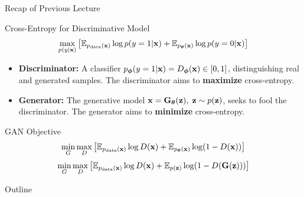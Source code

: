 \documentclass{beamer}
\begin{document}
\begin{frame}{Recap of Previous Lecture}
	\begin{block}{Cross-Entropy for Discriminative Model}
		\vspace{-0.3cm}
		\[
			\max_{p(y | \mathbf{x})} \left[\mathbb{E}_{p_{\text{data}}(\mathbf{x})} \log p(y = 1 | \mathbf{x}) + \mathbb{E}_{p_{\boldsymbol{\theta}}(\mathbf{x})} \log p(y = 0 | \mathbf{x}) \right] 
		\]
	\end{block}
	\eqpause
	\begin{itemize}
		\item \textbf{Discriminator:} A classifier $p_{\boldsymbol{\phi}}(y = 1 | \mathbf{x}) = D_{\boldsymbol{\phi}}(\mathbf{x}) \in [0, 1]$, distinguishing real and generated samples. The discriminator aims to \textbf{maximize} cross-entropy.
		\item \textbf{Generator:} The generative model $\mathbf{x} = \mathbf{G}_{\boldsymbol{\theta}}(\mathbf{z}),\; \mathbf{z} \sim p(\mathbf{z})$, seeks to fool the discriminator. The generator aims to \textbf{minimize} cross-entropy.
	\end{itemize}
	\eqpause
	\begin{block}{GAN Objective}
		\vspace{-0.5cm}
		\[
			\min_{G} \max_D \left[ \mathbb{E}_{p_{\text{data}}(\mathbf{x})} \log D(\mathbf{x}) + \mathbb{E}_{p_{\boldsymbol{\theta}}(\mathbf{x})} \log (1 - D(\mathbf{x})) \right] 
		\]
		\eqpause
		\[
			\min_{G} \max_D \left[ \mathbb{E}_{p_{\text{data}}(\mathbf{x})} \log D(\mathbf{x}) + \mathbb{E}_{p(\mathbf{z})} \log (1 - D(\mathbf{G}(\mathbf{z}))) \right]
		\]
	\end{block}
\end{frame}
\begin{frame}{Outline}
	\tableofcontents
\end{frame}
\end{document}
